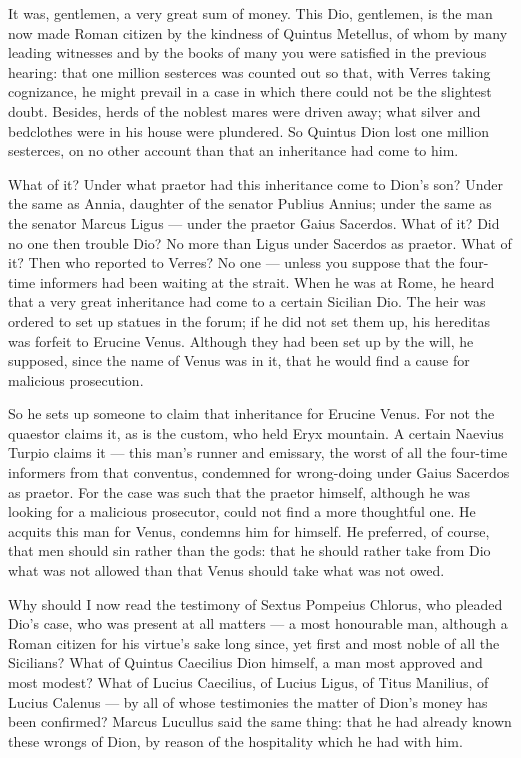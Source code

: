  It was, gentlemen, a very great sum of money. This Dio, gentlemen, is the man now made Roman citizen by the kindness of Quintus Metellus, of whom by many leading witnesses and by the books of many you were satisfied in the previous hearing: that one million sesterces was counted out so that, with Verres taking cognizance, he might prevail in a case in which there could not be the slightest doubt. Besides, herds of the noblest mares were driven away; what silver and bedclothes were in his house were plundered. So Quintus Dion lost one million sesterces, on no other account than that an inheritance had come to him.

 What of it? Under what praetor had this inheritance come to Dion's son? Under the same as Annia, daughter of the senator Publius Annius; under the same as the senator Marcus Ligus --- under the praetor Gaius Sacerdos. What of it? Did no one then trouble Dio? No more than Ligus under Sacerdos as praetor. What of it? Then who reported to Verres? No one --- unless you suppose that the four-time informers had been waiting at the strait. When he was at Rome, he heard that a very great inheritance had come to a certain Sicilian Dio. The heir was ordered to set up statues in the forum; if he did not set them up, his hereditas was forfeit to Erucine Venus. Although they had been set up by the will, he supposed, since the name of Venus was in it, that he would find a cause for malicious prosecution.

 So he sets up someone to claim that inheritance for Erucine Venus. For not the quaestor claims it, as is the custom, who held Eryx mountain. A certain Naevius Turpio claims it --- this man's runner and emissary, the worst of all the four-time informers from that conventus, condemned for wrong-doing under Gaius Sacerdos as praetor. For the case was such that the praetor himself, although he was looking for a malicious prosecutor, could not find a more thoughtful one. He acquits this man for Venus, condemns him for himself. He preferred, of course, that men should sin rather than the gods: that he should rather take from Dio what was not allowed than that Venus should take what was not owed.

 Why should I now read the testimony of Sextus Pompeius Chlorus, who pleaded Dio's case, who was present at all matters --- a most honourable man, although a Roman citizen for his virtue's sake long since, yet first and most noble of all the Sicilians? What of Quintus Caecilius Dion himself, a man most approved and most modest? What of Lucius Caecilius, of Lucius Ligus, of Titus Manilius, of Lucius Calenus --- by all of whose testimonies the matter of Dion's money has been confirmed? Marcus Lucullus said the same thing: that he had already known these wrongs of Dion, by reason of the hospitality which he had with him.

